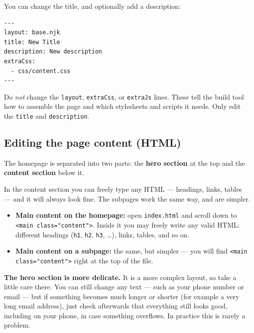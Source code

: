 \documentclass[11pt,a4paper]{article}
\newcommand{\file}[1]{\texttt{#1}}
\begin{document}
\noindent You can change the title, and optionally add a description:

\begin{lstlisting}[style=code, language=yamlfront]
---
layout: base.njk
title: New Title
description: New description
extraCss:
  - css/content.css
---
\end{lstlisting}

\begin{importantbox}
Do \emph{not} change the \texttt{layout}, \texttt{extraCss}, or
\texttt{extraJs} lines. These tell the build tool how to assemble the page
and which stylesheets and scripts it needs. Only edit the \texttt{title}
and \texttt{description}.
\end{importantbox}

\subsection{Editing the page content (HTML)}

The homepage is separated into two parts: the \textbf{hero section} at the
top and the \textbf{content section} below it.

In the content section you can freely type any HTML — headings, links,
tables — and it will always look fine. The subpages work the same way, and
are simpler.

\begin{itemize}[leftmargin=1.4em]
  \item \textbf{Main content on the homepage:} open \file{index.html} and
        scroll down to \texttt{<main class="content">}. Inside it you may
        freely write any valid HTML: different headings
        (\texttt{h1}, \texttt{h2}, \texttt{h3}, \dots), links, tables, and
        so on.
  \item \textbf{Main content on a subpage:} the same, but simpler — you
        will find \texttt{<main class="content">} right at the top of the
        file.
\end{itemize}

\begin{tipbox}
\textbf{The hero section is more delicate.} It is a more complex layout,
so take a little care there. You can still change any text — such as your
phone number or email — but if something becomes much longer or shorter
(for example a very long email address), just check afterwards that
everything still looks good, including on your phone, in case something
overflows. In practice this is rarely a problem.
\end{tipbox}
\end{document}
